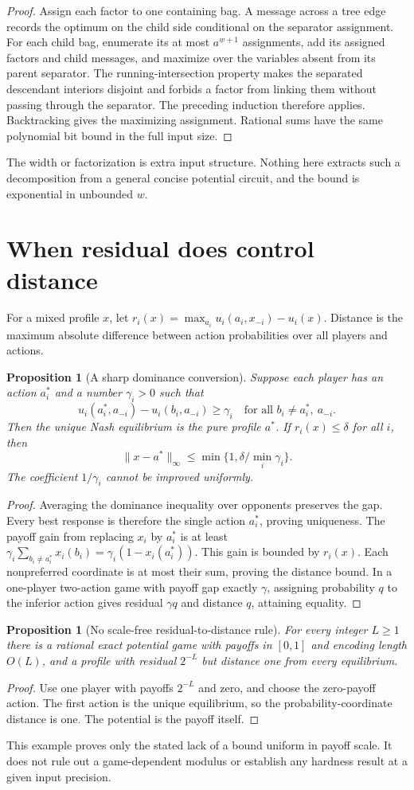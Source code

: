 \documentclass[11pt,a4paper]{article}
\newtheorem{proposition}[theorem]{Proposition}
\theoremstyle{definition}
\theoremstyle{remark}
\begin{document}
\begin{proof}
Assign each factor to one containing bag. A message across a tree edge records the optimum on the child side conditional on the separator assignment. For each child bag, enumerate its at most $a^{w+1}$ assignments, add its assigned factors and child messages, and maximize over the variables absent from its parent separator. The running-intersection property makes the separated descendant interiors disjoint and forbids a factor from linking them without passing through the separator. The preceding induction therefore applies. Backtracking gives the maximizing assignment. Rational sums have the same polynomial bit bound in the full input size.
\end{proof}
The width or factorization is extra input structure. Nothing here extracts such a decomposition from a general concise potential circuit, and the bound is exponential in unbounded $w$.
\section{When residual does control distance}
For a mixed profile $x$, let
$r_i(x)=\max_{a_i}u_i(a_i,x_{-i})-u_i(x)$.
Distance is the maximum absolute difference between action probabilities over all players and actions.
\begin{proposition}[A sharp dominance conversion]
Suppose each player has an action $a_i^*$ and a number $\gamma_i>0$ such that
\[
 u_i(a_i^*,a_{-i})-u_i(b_i,a_{-i})\ge\gamma_i
 \quad\text{for all }b_i\ne a_i^*,\ a_{-i}.
\]
Then the unique Nash equilibrium is the pure profile $a^*$. If $r_i(x)\le\delta$ for all $i$, then
\[
 \|x-a^*\|_\infty\le
      \min\{1,\delta/\min_i\gamma_i\}.
\]
The coefficient $1/\gamma_i$ cannot be improved uniformly.
\end{proposition}
\begin{proof}
Averaging the dominance inequality over opponents preserves the gap. Every best response is therefore the single action $a_i^*$, proving uniqueness. The payoff gain from replacing $x_i$ by $a_i^*$ is at least
$\gamma_i\sum_{b_i\ne a_i^*}x_i(b_i)=\gamma_i(1-x_i(a_i^*))$.
This gain is bounded by $r_i(x)$. Each nonpreferred coordinate is at most their sum, proving the distance bound. In a one-player two-action game with payoff gap exactly $\gamma$, assigning probability $q$ to the inferior action gives residual $\gamma q$ and distance $q$, attaining equality.
\end{proof}
\begin{proposition}[No scale-free residual-to-distance rule]
For every integer $L\ge1$ there is a rational exact potential game with payoffs in $[0,1]$ and encoding length $O(L)$, and a profile with residual $2^{-L}$ but distance one from every equilibrium.
\end{proposition}
\begin{proof}
Use one player with payoffs $2^{-L}$ and zero, and choose the zero-payoff action. The first action is the unique equilibrium, so the probability-coordinate distance is one. The potential is the payoff itself.
\end{proof}
This example proves only the stated lack of a bound uniform in payoff scale. It does not rule out a game-dependent modulus or establish any hardness result at a given input precision.
\end{document}
